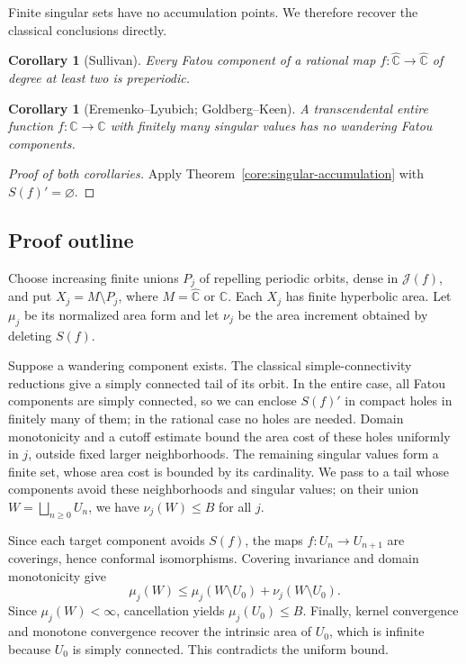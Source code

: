 \documentclass[10pt,a4paper]{amsart}
\newcommand{\C}{\mathbb C}
\newcommand{\sphere}{\widehat{\mathbb C}}
\newcommand{\Jul}{\mathcal J}
\newtheorem{corollary}[theorem]{Corollary}
\numberwithin{equation}{section}
\begin{document}
Finite singular sets have no accumulation points. We therefore recover
the classical conclusions directly.

\begin{corollary}[Sullivan]\label{core:sullivan}
Every Fatou component of a rational map $f:\sphere\to\sphere$ of
degree at least two is preperiodic.
\end{corollary}
\begin{corollary}[Eremenko--Lyubich; Goldberg--Keen]\label{core:el}
A transcendental entire function $f:\C\to\C$ with finitely many
singular values has no wandering Fatou components.
\end{corollary}
\begin{proof}[Proof of both corollaries]
Apply Theorem~\ref{core:singular-accumulation} with $S(f)'=\varnothing$.
\end{proof}

\subsection*{Proof outline}
Choose increasing finite unions $P_j$ of repelling periodic orbits,
dense in $\Jul(f)$, and put $X_j=M\setminus P_j$, where $M=\sphere$
or $\C$. Each $X_j$ has finite hyperbolic area. Let $\mu_j$ be its
normalized area form and let $\nu_j$ be the area increment obtained
by deleting $S(f)$.

Suppose a wandering component exists. The classical simple-connectivity
reductions give a simply connected tail of its orbit. In the entire
case, all Fatou components are simply connected, so we can enclose
$S(f)'$ in compact holes in finitely many of them; in the rational
case no holes are needed. Domain monotonicity and a cutoff estimate bound the
area cost of these holes uniformly in $j$, outside fixed larger
neighborhoods. The remaining singular values form a finite set, whose
area cost is bounded by its cardinality. We pass to a tail whose
components avoid these neighborhoods and singular values; on their union
$W=\bigsqcup_{n\ge0}U_n$, we have $\nu_j(W)\le B$ for all $j$.

Since each target component avoids $S(f)$, the maps
$f:U_n\to U_{n+1}$ are coverings, hence conformal isomorphisms.
Covering invariance and domain monotonicity give
\[
 \mu_j(W)\le\mu_j(W\setminus U_0)+\nu_j(W\setminus U_0).
\]
Since $\mu_j(W)<\infty$, cancellation yields $\mu_j(U_0)\le B$.
Finally, kernel convergence and monotone convergence recover the
intrinsic area of $U_0$, which is infinite because $U_0$ is simply
connected. This contradicts the uniform bound.
\end{document}
